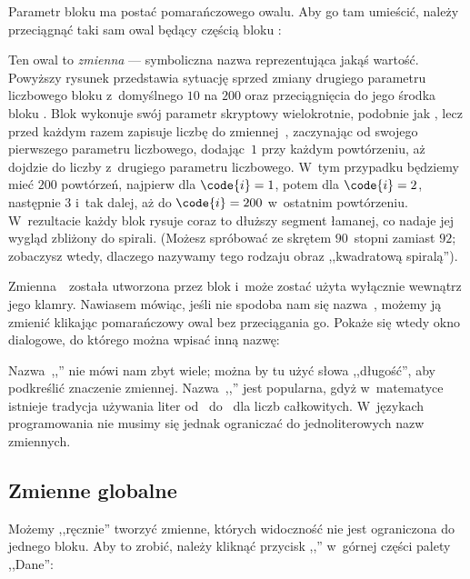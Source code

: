 \documentclass[a4paper]{report}
\begin{document}

Parametr bloku  ma postać pomarańczowego owalu. Aby go tam umieścić, należy przeciągnąć taki sam owal będący częścią bloku :\nopagebreak


Ten owal to \emph{zmienna} --- symboliczna nazwa reprezentująca jakąś wartość. Powyższy rysunek przedstawia sytuację sprzed zmiany drugiego parametru liczbowego bloku  z~domyślnego $10$ na $200$ oraz przeciągnięcia do jego środka bloku . Blok  wykonuje swój parametr skryptowy wielokrotnie, podobnie jak , lecz przed każdym razem zapisuje liczbę do zmiennej~, zaczynając od swojego pierwszego parametru liczbowego, dodając~$1$ przy każdym powtórzeniu, aż dojdzie do liczby z~drugiego parametru liczbowego. W~tym przypadku będziemy mieć $200$ powtórzeń, najpierw dla $\code{i}=1$, potem dla $\code{i}=2$, następnie $3$ i~tak dalej, aż do $\code{i}=200$ w~ostatnim powtórzeniu. W~rezultacie każdy blok  rysuje coraz to dłuższy segment łamanej, co nadaje jej wygląd zbliżony do spirali. (Możesz spróbować ze skrętem $90$~stopni zamiast $92$; zobaczysz wtedy, dlaczego nazywamy tego rodzaju obraz ,,kwadratową spiralą'').

Zmienna~~została utworzona przez blok  i~może zostać użyta wyłącznie wewnątrz jego klamry. Nawiasem mówiąc, jeśli nie spodoba nam się nazwa~, możemy ją zmienić klikając pomarańczowy owal bez przeciągania go. Pokaże się wtedy okno dialogowe, do którego można wpisać inną nazwę:\nopagebreak


Nazwa~,,'' nie mówi nam zbyt wiele; można by tu użyć słowa ,,długość'', aby podkreślić znaczenie zmiennej. Nazwa~,,'' jest popularna, gdyż w~matematyce istnieje tradycja używania liter od~ do~ dla liczb całkowitych. W~językach programowania nie musimy się jednak ograniczać do jednoliterowych nazw zmiennych.

\subsection{Zmienne globalne}

Możemy ,,ręcznie'' tworzyć zmienne, których widoczność nie jest ograniczona do jednego bloku. Aby to zrobić, należy kliknąć przycisk ,,'' w~górnej części palety ,,Dane'':\nopagebreak
\end{document}
